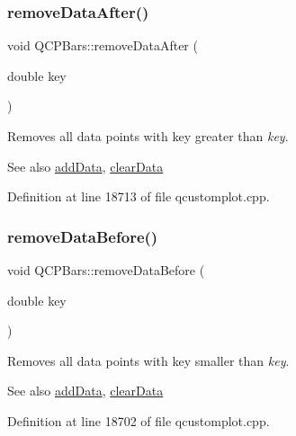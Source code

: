 \mbox{\label{class_q_c_p_bars_a99de6e7abbbf03fb41fa604c7f08aa8b}} 
\subsubsection{\texorpdfstring{remove\+Data\+After()}{removeDataAfter()}}
{\footnotesize\ttfamily void Q\+C\+P\+Bars\+::remove\+Data\+After (\begin{DoxyParamCaption}\item[{double}]{key }\end{DoxyParamCaption})}

Removes all data points with key greater than {\itshape key}. \begin{DoxySeeAlso}{See also}
\hyperlink{class_q_c_p_bars_a1f29cf08615040993209147fa68de3f2}{add\+Data}, \hyperlink{class_q_c_p_bars_a11dbbd707132f07f862dff13c5789c2b}{clear\+Data} 
\end{DoxySeeAlso}


Definition at line 18713 of file qcustomplot.\+cpp.

\mbox{\label{class_q_c_p_bars_a9d12779a3fad4820aad2c428f368298d}} 
\subsubsection{\texorpdfstring{remove\+Data\+Before()}{removeDataBefore()}}
{\footnotesize\ttfamily void Q\+C\+P\+Bars\+::remove\+Data\+Before (\begin{DoxyParamCaption}\item[{double}]{key }\end{DoxyParamCaption})}

Removes all data points with key smaller than {\itshape key}. \begin{DoxySeeAlso}{See also}
\hyperlink{class_q_c_p_bars_a1f29cf08615040993209147fa68de3f2}{add\+Data}, \hyperlink{class_q_c_p_bars_a11dbbd707132f07f862dff13c5789c2b}{clear\+Data} 
\end{DoxySeeAlso}


Definition at line 18702 of file qcustomplot.\+cpp.

